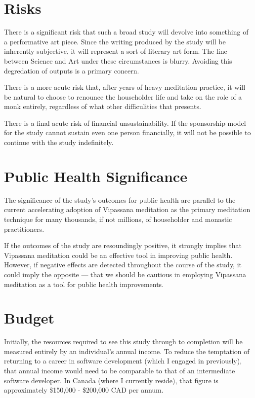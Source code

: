 \documentclass[a4paper, amsfonts, amssymb, amsmath, reprint, showkeys, nofootinbib, twoside]{revtex4-1}
\begin{document}
\section{Risks}

There is a significant risk that such a broad study will devolve into
something of a performative art piece.
Since the writing produced by the study will be inherently subjective,
it will represent a sort of literary art form.
The line between Science and Art under these circumstances is blurry.
Avoiding this degredation of outputs is a primary concern.

There is a more acute risk that, after years of heavy meditation practice,
it will be natural to choose to renounce the householder life and take on
the role of a monk entirely, regardless of what other difficulities that
presents.

There is a final acute risk of financial unsustainability.
If the sponsorship model for the study cannot sustain even one person
financially, it will not be possible to continue with the study
indefinitely.

\section{Public Health Significance}

The significance of the study's outcomes for public health are parallel
to the current accelerating adoption of Vipassana meditation as the
primary meditation technique for many thousands, if not millions, of
householder and monastic practitioners.

If the outcomes of the study are resoundingly positive, it strongly
implies that Vipassana meditation could be an effective tool in
improving public health.
However, if negative effects are detected throughout the course of the
study, it could imply the opposite --- that we should be cautious in
employing Vipassana meditation as a tool for public health improvements.

\section{Budget}

Initially, the resources required to see this study through to completion
will be measured entirely by an individual's annual income.
To reduce the temptation of returning to a career in software development
(which I engaged in previously), that annual income would need to be
comparable to that of an intermediate software developer.
In Canada (where I currently reside), that figure is approximately
\$150,000 - \$200,000 CAD per annum.
\end{document}
